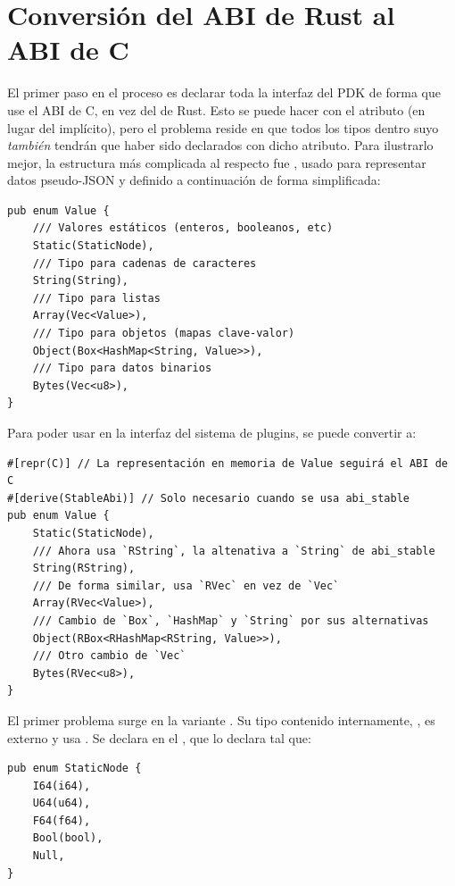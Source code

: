 \chapter{Conversión del ABI de Rust al ABI de C}\label{annex:abi}

El primer paso en el proceso es declarar toda la interfaz del PDK de forma que
use el ABI de C, en vez del de Rust. Esto se puede hacer con el atributo
\rust{#[repr(C)]} (en lugar del  implícito), pero el
problema reside en que todos los tipos dentro suyo \emph{también} tendrán que
haber sido declarados con dicho atributo. Para ilustrarlo mejor, la estructura
más complicada al respecto fue , usado para representar datos
pseudo-JSON y definido a continuación de forma simplificada:

\begin{verbatim}
pub enum Value {
    /// Valores estáticos (enteros, booleanos, etc)
    Static(StaticNode),
    /// Tipo para cadenas de caracteres
    String(String),
    /// Tipo para listas
    Array(Vec<Value>),
    /// Tipo para objetos (mapas clave-valor)
    Object(Box<HashMap<String, Value>>),
    /// Tipo para datos binarios
    Bytes(Vec<u8>),
}
\end{verbatim}

Para poder usar  en la interfaz del sistema de plugins, se puede
convertir a:

\begin{verbatim}
#[repr(C)] // La representación en memoria de Value seguirá el ABI de C
#[derive(StableAbi)] // Solo necesario cuando se usa abi_stable
pub enum Value {
    Static(StaticNode),
    /// Ahora usa `RString`, la altenativa a `String` de abi_stable
    String(RString),
    /// De forma similar, usa `RVec` en vez de `Vec`
    Array(RVec<Value>),
    /// Cambio de `Box`, `HashMap` y `String` por sus alternativas
    Object(RBox<RHashMap<RString, Value>>),
    /// Otro cambio de `Vec`
    Bytes(RVec<u8>),
}
\end{verbatim}

El primer problema surge en la variante . Su tipo contenido
internamente, , es externo y usa . Se
declara en el \crate {}, que lo declara tal que:

\begin{verbatim}
pub enum StaticNode {
    I64(i64),
    U64(u64),
    F64(f64),
    Bool(bool),
    Null,
}
\end{verbatim}

